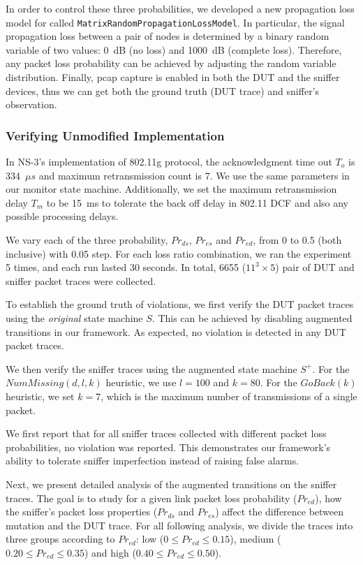 In order to control these three probabilities, we developed a new propagation
loss model for \ns{} called \texttt{MatrixRandomPropagationLossModel}. In
particular, the signal propagation loss between a pair of nodes is determined by
a binary random variable of two values: 0~dB (no loss) and 1000~dB (complete
loss).  Therefore, any packet loss probability can be achieved by adjusting the
random variable distribution. Finally, pcap capture is enabled in both the DUT
and the sniffer devices, thus we can get both the ground truth (DUT trace) and
sniffer's observation.


\subsubsection{Verifying Unmodified Implementation}

In NS-3's implementation of 802.11g protocol, the acknowledgment time out $T_o$
is 334~$\mu s$ and maximum retransmission count is 7.  We use the same
parameters in our monitor state machine.  Additionally, we set the maximum
retransmission delay $T_m$ to be 15~ms to tolerate the back off delay in 802.11
DCF and also any possible processing delays.


We vary each of the three probability, $Pr_{ds}$, $Pr_{es}$ and $Pr_{ed}$, from
0 to 0.5 (both inclusive) with 0.05 step.  For each loss ratio combination, we
ran the experiment 5 times, and each run lasted
30 seconds.  In total, 6655 ($11^3\times 5$) pair of DUT and sniffer packet
   traces were collected.

To establish the ground truth of violations, we first verify the DUT packet
traces using the \textit{original} state machine $S$.  This can be achieved by
disabling augmented transitions in our framework.  As expected, no violation is
detected in any DUT packet traces.

We then verify the sniffer traces using the augmented state machine $S^+$.  For
the $NumMissing(d, l, k)$ heuristic, we use $l=100$ and $k=80$.
For the $GoBack(k)$ heuristic, we set $k=7$, which is the maximum number of
transmissions of a single packet.

We first report that for all sniffer traces collected with different packet loss
probabilities, no violation was reported. This demonstrates our framework's
ability to tolerate sniffer imperfection instead of raising false alarms.

Next, we present detailed analysis of the augmented transitions on the sniffer
traces. The goal is to study for a given link packet loss probability
($Pr_{ed}$), how the sniffer's packet loss properties ($Pr_{ds}$ and $Pr_{es}$)
affect the difference between mutation and the DUT trace.  For all following
analysis, we divide the traces into three groups according to $Pr_{ed}$: low ($0
\le Pr_{ed} \le 0.15$), medium ($0.20 \le Pr_{ed} \le 0.35$) and high ($0.40 \le
Pr_{ed} \le 0.50$).

